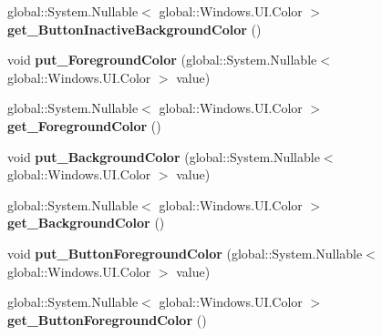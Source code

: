 \begin{DoxyCompactItemize}
global\+::\+System.\+Nullable$<$ global\+::\+Windows.\+U\+I.\+Color $>$ {\bfseries get\+\_\+\+Button\+Inactive\+Background\+Color} ()
\item 
\mbox{\label{interface_windows_1_1_u_i_1_1_view_management_1_1_i_application_view_title_bar_a2c9b8e377e58bb9b24d1831d431d7cb8}} 
void {\bfseries put\+\_\+\+Foreground\+Color} (global\+::\+System.\+Nullable$<$ global\+::\+Windows.\+U\+I.\+Color $>$ value)
\item 
\mbox{\label{interface_windows_1_1_u_i_1_1_view_management_1_1_i_application_view_title_bar_a5fe06168420ee342f2b206c5db71e9d4}} 
global\+::\+System.\+Nullable$<$ global\+::\+Windows.\+U\+I.\+Color $>$ {\bfseries get\+\_\+\+Foreground\+Color} ()
\item 
\mbox{\label{interface_windows_1_1_u_i_1_1_view_management_1_1_i_application_view_title_bar_a8f1570efd073d4f98de8305ea238203d}} 
void {\bfseries put\+\_\+\+Background\+Color} (global\+::\+System.\+Nullable$<$ global\+::\+Windows.\+U\+I.\+Color $>$ value)
\item 
\mbox{\label{interface_windows_1_1_u_i_1_1_view_management_1_1_i_application_view_title_bar_af30b2ae748ffe820b7b1c6f69ef893b1}} 
global\+::\+System.\+Nullable$<$ global\+::\+Windows.\+U\+I.\+Color $>$ {\bfseries get\+\_\+\+Background\+Color} ()
\item 
\mbox{\label{interface_windows_1_1_u_i_1_1_view_management_1_1_i_application_view_title_bar_a79b0e9d27826cb5e56af8d4a73f6cd2f}} 
void {\bfseries put\+\_\+\+Button\+Foreground\+Color} (global\+::\+System.\+Nullable$<$ global\+::\+Windows.\+U\+I.\+Color $>$ value)
\item 
\mbox{\label{interface_windows_1_1_u_i_1_1_view_management_1_1_i_application_view_title_bar_a1e98b68f7deda40dcc079398e337b879}} 
global\+::\+System.\+Nullable$<$ global\+::\+Windows.\+U\+I.\+Color $>$ {\bfseries get\+\_\+\+Button\+Foreground\+Color} ()

\end{DoxyCompactItemize}
